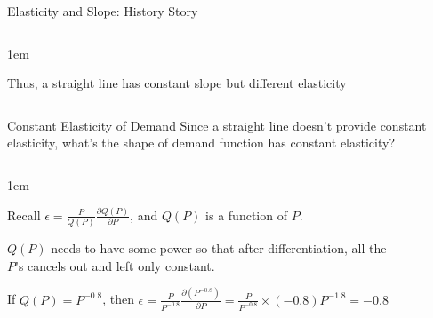 \documentclass[11pt,aspectratio=43,usenames,dvipsnames]{beamer}
\let\olditemize=\itemize
\let\endolditemize=\enditemize
\renewenvironment{itemize}{\olditemize \itemsep1em}{\endolditemize}
\theoremstyle{definition}
\begin{document}
\begin{frame}{Elasticity and Slope: History Story}
\begin{columns}
\begin{column}{0.5\textwidth}
{\begin{itemize}
                \item Thus, a straight line has \alert{constant slope} but \alert{different elasticity}
            \end{itemize}
            }
        \end{column}
        \begin{column}{0.5\textwidth}
        \end{column}
    \end{columns}

\end{frame}

\begin{frame}{Constant Elasticity of Demand}
\label{slide:Constant_Elasticity_of_Demand}
    Since a straight line doesn't provide constant elasticity, what's the shape of demand function has constant elasticity?
    \begin{columns}
        \begin{column}{0.5\textwidth}
            \begin{itemize}
                \item Recall $ \epsilon = \frac{P}{Q(P)} \frac{\partial Q(P)}{\partial P} $, and $ Q(P) $ is a function of $ P $.
                \item $ Q(P) $ needs to have some \alert{power} so that after differentiation, all the $ P $'s cancels out and left only constant.
                \item If $ Q(P) = P^{-0.8} $, then $ \epsilon = \frac{P}{P^{-0.8}} \frac{\partial (P^{-0.8})}{\partial P} = \frac{P}{P^{-0.8}} \times  (-0.8) P^{-1.8} = -0.8 $
            \end{itemize}

        \end{column}
        \begin{column}{0.5\textwidth}
            \begin{figure}
                \centering
                
            \end{figure}
        \end{column}
    \end{columns}

\end{frame}
\end{document}
